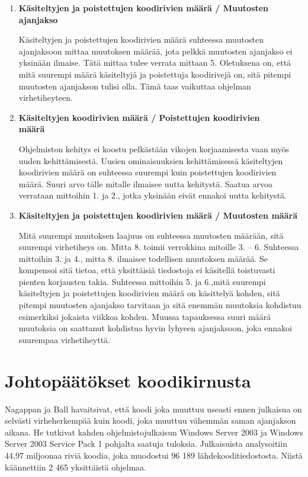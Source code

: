 \documentclass[finnish]{../tktltiki2}
\theoremstyle{definition}
\theoremstyle{remark}
\begin{document}
\begin{enumerate}
    \item {\bf Käsiteltyjen ja poistettujen koodirivien määrä / Muutosten ajanjakso}
    
    Käsiteltyjen ja poistettujen koodirivien määrä suhteessa muutosten ajanjaksoon mittaa muutoksen määrää, jota pelkkä 
    muutosten ajanjakso ei yksinään ilmaise. Tätä mittaa tulee verrata mittaan 5. Oletuksena on, että mitä suurempi 
    määrä käsiteltyjä ja poistettuja koodirivejä on, sitä pitempi muutosten ajanjakson tulisi olla. Tämä taas vaikuttaa 
    ohjelman virhetiheyteen.

    \item {\bf Käsiteltyjen koodirivien määrä / Poistettujen koodirivien\\määrä}
    
    Ohjelmiston kehitys ei koostu pelkästään vikojen korjaamisesta vaan myös uuden kehittämisestä. Uusien ominaisuuksien 
    kehittämisessä käsiteltyjen koodirivien määrä on suhteessa suurempi kuin poistettujen koodirivien määrä. Suuri arvo 
    tälle mitalle ilmaisee uutta kehitystä. Saatua arvoa verrataan mittoihin 1. ja 2., jotka yksinään eivät ennakoi 
    uutta kehitystä.

    \item {\bf Käsiteltyjen ja poistettujen koodirivien määrä / Muutosten määrä}
    
    Mitä suurempi muutoksen laajuus on suhteessa muutosten määrään, sitä suurempi virhetiheys on. Mitta 8. toimii
    verrokkina mitoille 3. -- 6. Suhteessa mittoihin 3. ja 4., mitta 8. ilmaisee todellisen muutoksen määrää. Se
    kompensoi sitä tietoa, että yksittäisiä tiedostoja ei käsitellä toistuvasti pienten korjausten takia. Suhteessa
    mittoihin 5. ja 6.,mitä suurempi käsiteltyjen ja poistettujen koodirivien määrä on käsittelyä kohden, sitä pitempi 
    muutosten ajanjakso tarvitaan ja sitä enemmän muutoksia kohdistuu esimerkiksi jokaista viikkoa kohden. Muussa 
    tapauksessa suuri määrä muutoksia on saattanut kohdistua hyvin lyhyeen ajanjaksoon, joka ennakoi suurempaa 
    virhetiheyttä.

\end{enumerate}

\section{Johtopäätökset koodikirnusta}

Nagappan ja Ball havaitsivat, että koodi joka muuttuu useasti ennen julkaisua on selvästi virheherkempää kuin koodi, 
joka muuttuu vähemmän saman ajanjakson aikana. He tutkivat kahden ohjelmistojulkaisun Windows Server 2003 ja Windows 
Server 2003 Service Pack 1 pohjalta saatuja tuloksia. Julkaisuista analysoitiin 44,97 miljoonaa riviä koodia, joka 
muodostui 96 189 lähdekooditiedostosta. Niistä käännettiin 2 465 yksittäistä ohjelmaa.\newline
\end{document}
